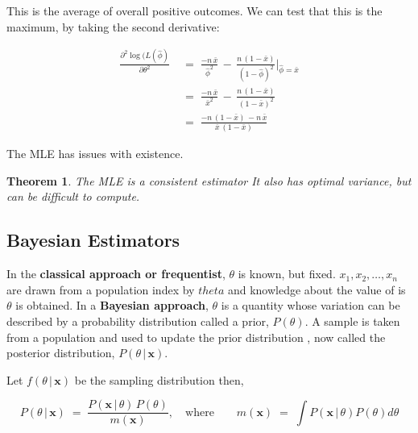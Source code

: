 \documentclass[10pt]{article}
\newtheorem{theorem}{Theorem}
\numberwithin{equation}{section}
\begin{document}
\noindent
This is the average of overall positive outcomes.  We can test that this is the maximum, by taking the second derivative:


\begin{align}
\frac{\partial^{2} \log(L(\widehat{\phi})}{\partial \theta^{2}}
 \; &= \; 
 \frac{-n \, \bar{x} }{\widehat{\phi}^{2}}  \, - \,  \frac{n  \, (1-  \bar{x}) }{(1 - \widehat{\phi})^{2}}   \vert_{\widehat{\phi} = \bar{x}}  \\
 &= \;   \frac{-n \, \bar{x} }{\bar{x} ^{2}}  \, - \, \frac{n  \, (1-  \bar{x}) }{(1 - \bar{x} )^{2}} \\
  &= \;   \frac{ - n \, ( 1 - \bar{x} ) \,  - n \, \bar{x}  }{\bar{x} \, (1 - \bar{x} )} 
\end{align}

\vspace{2mm}

\noindent
The MLE has issues with existence. 


\vspace{2mm}


\noindent
\begin{theorem}{The MLE is a consistent estimator} \newline
It also has optimal variance, but can be difficult to compute.
\end{theorem}



\subsection{Bayesian Estimators}


In the \textbf{classical approach or frequentist}, $\theta$ is known, but fixed.  $x_1, x_2, \ldots, x_n$ are drawn from a population index by $theta$ and knowledge about the value of is $\theta$ is obtained. In a \textbf{Bayesian approach}, $\theta$ is a quantity whose variation can be described by a probability distribution called a prior, $P(\theta)$.  A sample is taken from a population and used to update the prior distribution , now called the posterior distribution, $P(\theta \, \vert \, \textbf{x})$.

\vspace{1mm}

Let $f(\theta \, \vert \, \textbf{x})$ be the sampling distribution then,

$$ P(\theta \, \vert \, \textbf{x})
 \; = \; 
\frac{ P ( \textbf{x} \, \vert \, \theta) \, P(\theta)}{m(\textbf{x})}, \quad \text{where} \qquad m(\textbf{x}) \; = \; \int P ( \textbf{x} \, \vert \, \theta) P(\theta) d\theta
 $$
 
\end{document}
